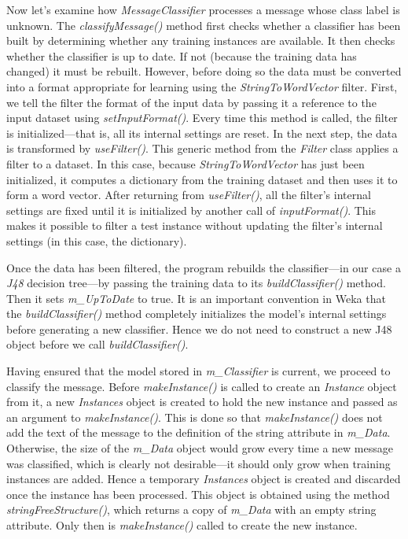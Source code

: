 Now let's examine how \textit{MessageClassifier} processes a message
whose class label is unknown. The \textit{classifyMessage()} method
first checks whether a classifier has been built by determining
whether any training instances are available. It then checks whether
the classifier is up to date. If not (because the training data has
changed) it must be rebuilt. However, before doing so the data must be
converted into a format appropriate for learning using the
\textit{StringToWordVector} filter. First, we tell the filter the
format of the input data by passing it a reference to the input
dataset using \textit{setInputFormat()}. Every time this method is
called, the filter is initialized---that is, all its internal settings
are reset. In the next step, the data is transformed by
\textit{useFilter()}. This generic method from the \textit{Filter}
class applies a filter to a dataset. In this case, because
\textit{StringToWordVector} has just been initialized, it computes a
dictionary from the training dataset and then uses it to form a word
vector. After returning from \textit{useFilter()}, all the filter’s
internal settings are fixed until it is initialized by another call of
\textit{inputFormat()}. This makes it possible to filter a test
instance without updating the filter’s internal settings (in this
case, the dictionary).

Once the data has been filtered, the program rebuilds the
classifier---in our case a \textit{J48} decision tree---by passing the
training data to its \textit{buildClassifier()} method. Then it sets
\textit{m\_UpToDate} to true. It is an important convention in Weka
that the \textit{buildClassifier()} method completely initializes the
model's internal settings before generating a new classifier. Hence we
do not need to construct a new J48 object before we call
\textit{buildClassifier()}.

Having ensured that the model stored in \textit{m\_Classifier} is
current, we proceed to classify the message. Before
\textit{makeInstance()} is called to create an \textit{Instance}
object from it, a new \textit{Instances} object is created to hold the
new instance and passed as an argument to
\textit{makeInstance()}. This is done so that \textit{makeInstance()}
does not add the text of the message to the definition of the string
attribute in \textit{m\_Data}. Otherwise, the size of the
\textit{m\_Data} object would grow every time a new message was
classified, which is clearly not desirable---it should only grow when
training instances are added. Hence a temporary \textit{Instances}
object is created and discarded once the instance has been
processed. This object is obtained using the method
\textit{stringFreeStructure()}, which returns a copy of
\textit{m\_Data} with an empty string attribute. Only then is
\textit{makeInstance()} called to create the new instance.

